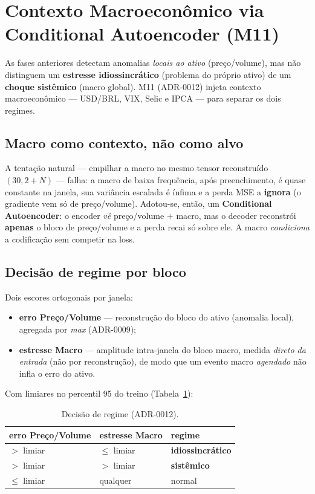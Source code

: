 \section{Contexto Macroeconômico via Conditional Autoencoder (M11)}
\label{sec:m11}

As fases anteriores detectam anomalias \emph{locais ao ativo} (preço/volume), mas não distinguem
um \textbf{estresse idiossincrático} (problema do próprio ativo) de um \textbf{choque sistêmico}
(macro global). M11 (ADR-0012) injeta contexto macroeconômico --- USD/BRL, VIX, Selic e IPCA ---
para separar os dois regimes.

\subsection{Macro como contexto, não como alvo}
\label{sec:m11-conditional}
A tentação natural --- empilhar a macro no mesmo tensor reconstruído $(30, 2+N)$ --- falha: a
macro de baixa frequência, após preenchimento, é quase constante na janela, sua variância escalada
é ínfima e a perda MSE a \textbf{ignora} (o gradiente vem só de preço/volume). Adotou-se, então, um
\textbf{Conditional Autoencoder}: o encoder \emph{vê} preço/volume $+$ macro, mas o decoder
reconstrói \textbf{apenas} o bloco de preço/volume e a perda recai só sobre ele. A macro
\emph{condiciona} a codificação sem competir na loss.

\subsection{Decisão de regime por bloco}
\label{sec:m11-regime}
Dois escores ortogonais por janela:
\begin{itemize}[noitemsep]
  \item \textbf{erro Preço/Volume} --- reconstrução do bloco do ativo (anomalia local), agregada
        por \emph{max} (ADR-0009);
  \item \textbf{estresse Macro} --- amplitude intra-janela do bloco macro, medida \emph{direto da
        entrada} (não por reconstrução), de modo que um evento macro \emph{agendado} não infla o
        erro do ativo.
\end{itemize}
Com limiares no percentil 95 do treino (Tabela~\ref{tab:m11-regime}):

\begin{table}[h]
\centering
\caption{Decisão de regime (ADR-0012).}
\label{tab:m11-regime}
\begin{tabular}{lll}
\toprule
\textbf{erro Preço/Volume} & \textbf{estresse Macro} & \textbf{regime} \\
\midrule
$>$ limiar & $\le$ limiar & \textbf{idiossincrático} \\
$>$ limiar & $>$ limiar & \textbf{sistêmico} \\
$\le$ limiar & qualquer & normal \\
\bottomrule
\end{tabular}
\end{table}

